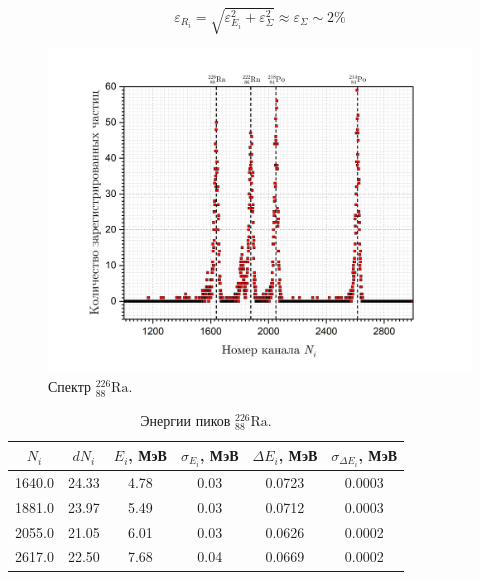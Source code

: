 \documentclass[a4paper, 12pt]{article}
\newcommand{\elem}[3]{{}^{#2}_{#3}\text{#1}}
\newcommand{\Ra}{\elem{Ra}{226}{88}}
\begin{document}
    $$ 
    \varepsilon_{R_i} = \sqrt{\varepsilon_{E_i}^2 + \varepsilon_{\Sigma}^2} \approx  \varepsilon_{\Sigma} \sim 2 \%
    $$
	
    \begin{figure}[H]
        \centering
        \includegraphics[width = 12 cm]{images/graph_ra.png}
        \caption{Спектр $\Ra$.}
        \label{fig:ra}
    \end{figure}
	
    \begin{table}[H]
        \centering
        \addtolength{\tabcolsep}{-4pt}
        \footnotesize
        \begin{tabular}{cccccc}
            \toprule
            $N_i$ & $dN_i$ & $E_i$, МэВ & $\sigma_{E_i}$, МэВ & $\Delta E_i$, МэВ & $\sigma_{\Delta E_i}$, МэВ \\
            \midrule
            1640.0 & 24.33 & 4.78 & 0.03 & 0.0723 & 0.0003 \\
            1881.0 & 23.97 & 5.49 & 0.03 & 0.0712 & 0.0003 \\
            2055.0 & 21.05 & 6.01 & 0.03 & 0.0626 & 0.0002 \\
            2617.0 & 22.50 & 7.68 & 0.04 & 0.0669 & 0.0002 \\
            \bottomrule
        \end{tabular}
        \caption{Энергии пиков $\Ra$.}
        \label{tab:term}
    \end{table}
	
\end{document}

